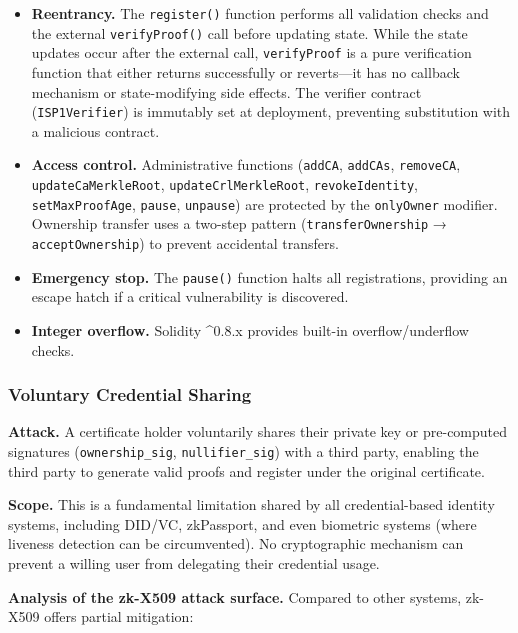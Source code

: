 \documentclass[11pt, a4paper]{article}
\providecommand{\tightlist}{%
  \setlength{\itemsep}{0pt}\setlength{\parskip}{0pt}}
\begin{document}
\begin{itemize}
\tightlist
\item
  \textbf{Reentrancy.} The \texttt{register()} function performs all
  validation checks and the external \texttt{verifyProof()} call before
  updating state. While the state updates occur after the external call,
  \texttt{verifyProof} is a pure verification function that either
  returns successfully or reverts---it has no callback mechanism or
  state-modifying side effects. The verifier contract
  (\texttt{ISP1Verifier}) is immutably set at deployment, preventing
  substitution with a malicious contract.
\item
  \textbf{Access control.} Administrative functions (\texttt{addCA},
  \texttt{addCAs}, \texttt{removeCA}, \texttt{updateCaMerkleRoot},
  \texttt{updateCrlMerkleRoot}, \texttt{revokeIdentity},
  \texttt{setMaxProofAge}, \texttt{pause}, \texttt{unpause}) are
  protected by the \texttt{onlyOwner} modifier. Ownership transfer uses
  a two-step pattern (\texttt{transferOwnership} →
  \texttt{acceptOwnership}) to prevent accidental transfers.
\item
  \textbf{Emergency stop.} The \texttt{pause()} function halts all
  registrations, providing an escape hatch if a critical vulnerability
  is discovered.
\item
  \textbf{Integer overflow.} Solidity \^{}0.8.x provides built-in
  overflow/underflow checks.
\end{itemize}

\subsubsection{Voluntary Credential
Sharing}\label{voluntary-credential-sharing}

\textbf{Attack.} A certificate holder voluntarily shares their private
key or pre-computed signatures (\texttt{ownership\_sig},
\texttt{nullifier\_sig}) with a third party, enabling the third party to
generate valid proofs and register under the original certificate.

\textbf{Scope.} This is a fundamental limitation shared by all
credential-based identity systems, including DID/VC, zkPassport, and
even biometric systems (where liveness detection can be circumvented).
No cryptographic mechanism can prevent a willing user from delegating
their credential usage.

\textbf{Analysis of the zk-X509 attack surface.} Compared to other
systems, zk-X509 offers partial mitigation:
\end{document}
